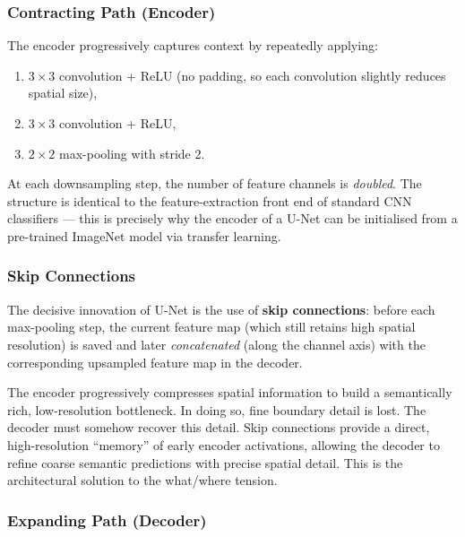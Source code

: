\documentclass[11pt,a4paper]{article}
\newcommand{\term}[1]{\textcolor{DefGreen}{\textbf{#1}}\index{#1}}
\begin{document}
\subsubsection{Contracting Path (Encoder)}

The encoder progressively captures context by repeatedly applying:
\begin{enumerate}
  \item $3\times 3$ convolution + ReLU (no padding, so each convolution slightly reduces spatial size),
  \item $3\times 3$ convolution + ReLU,
  \item $2\times 2$ max-pooling with stride 2.
\end{enumerate}
At each downsampling step, the number of feature channels is \emph{doubled}. The structure is identical to the feature-extraction front end of standard CNN classifiers — this is precisely why the encoder of a U-Net can be initialised from a pre-trained ImageNet model via transfer learning.

\subsubsection{Skip Connections}

The decisive innovation of U-Net is the use of \term{skip connections}: before each max-pooling step, the current feature map (which still retains high spatial resolution) is saved and later \emph{concatenated} (along the channel axis) with the corresponding upsampled feature map in the decoder.

\begin{insightbox}
The encoder progressively compresses spatial information to build a semantically rich, low-resolution bottleneck. In doing so, fine boundary detail is lost. The decoder must somehow recover this detail. Skip connections provide a direct, high-resolution ``memory'' of early encoder activations, allowing the decoder to refine coarse semantic predictions with precise spatial detail. This is the architectural solution to the what/where tension.
\end{insightbox}

\subsubsection{Expanding Path (Decoder)}
\end{document}
